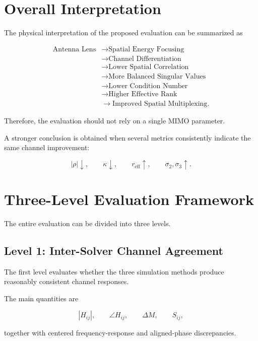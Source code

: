 \documentclass[11pt,a4paper]{article}
\begin{document}
\section{Overall Interpretation}

The physical interpretation of the proposed evaluation can be summarized as

\[
\boxed{
\begin{aligned}
\text{Antenna Lens}
&\rightarrow
\text{Spatial Energy Focusing}
\\
&\rightarrow
\text{Channel Differentiation}
\\
&\rightarrow
\text{Lower Spatial Correlation}
\\
&\rightarrow
\text{More Balanced Singular Values}
\\
&\rightarrow
\text{Lower Condition Number}
\\
&\rightarrow
\text{Higher Effective Rank}
\\
&\rightarrow
\text{Improved Spatial Multiplexing}.
\end{aligned}
}
\]

Therefore, the evaluation should not rely on a single MIMO parameter.

A stronger conclusion is obtained when several metrics consistently indicate the same channel improvement:

\[
\boxed{
|\rho|\downarrow,
\qquad
\kappa\downarrow,
\qquad
r_{\mathrm{eff}}\uparrow,
\qquad
\sigma_2,\sigma_3\uparrow.
}
\]

\section{Three-Level Evaluation Framework}

The entire evaluation can be divided into three levels.

\subsection{Level 1: Inter-Solver Channel Agreement}

The first level evaluates whether the three simulation methods produce reasonably consistent channel responses.

The main quantities are

\[
|H_{ij}|,
\qquad
\angle H_{ij},
\qquad
\Delta M,
\qquad
S_{ij},
\]

together with centered frequency-response and aligned-phase discrepancies.
\end{document}
